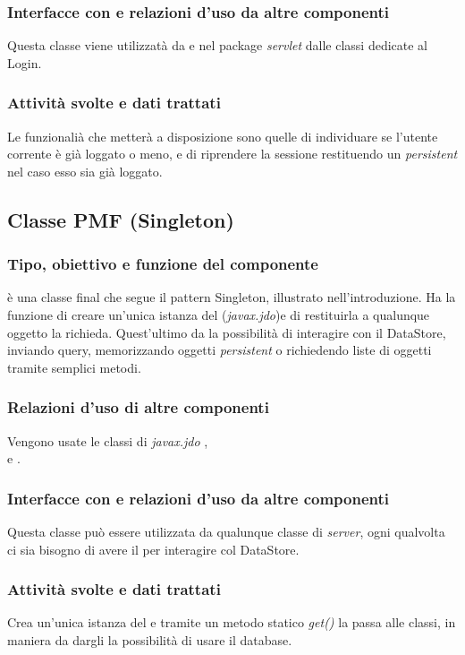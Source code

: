 \subsubsection*{Interfacce con e relazioni d'uso da altre componenti}
Questa classe viene utilizzat\`a da  e nel package
\emph{servlet} dalle classi dedicate al Login.

\subsubsection*{Attivit\`a svolte e dati trattati}
Le funzionali\`a che metter\`a a disposizione sono quelle di individuare se
l'utente corrente \`e gi\`a loggato o meno, e di riprendere la
sessione restituendo un \emph{persistent}  nel caso esso sia
gi\`a loggato.

\subsection{Classe PMF (Singleton)}
\subsubsection*{Tipo, obiettivo e funzione del componente}
 \`e una classe final che segue il pattern Singleton, illustrato
nell'introduzione. Ha la funzione di creare un'unica istanza del
 (\emph{javax.jdo})e di restituirla a qualunque
oggetto la richieda. Quest'ultimo da la possibilit\`a di interagire con il DataStore, inviando
query, memorizzando oggetti \emph{persistent} o richiedendo liste di oggetti
tramite semplici metodi.

\subsubsection*{Relazioni d'uso di altre componenti}
Vengono usate le classi di \emph{javax.jdo} ,
\\ e .

\subsubsection*{Interfacce con e relazioni d'uso da altre componenti}
Questa classe pu\`o essere utilizzata da qualunque classe di \emph{server}, ogni
qualvolta ci sia bisogno di avere il  per interagire col
DataStore.

\subsubsection*{Attivit\`a svolte e dati trattati}
Crea un'unica istanza del  e tramite un metodo
statico \emph{get()} la passa alle classi, in maniera da dargli la possibilit\`a
di usare il database.


